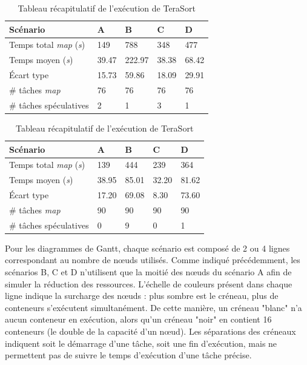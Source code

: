 \begin{table}
	\caption{Tableau récapitulatif de l'exécution de TeraSort} \label{tab:resumo}
	\centering
	\begin{tabular*}{0.6\hsize}{lllll} 
		\textbf{Scénario} & \textbf{A} & \textbf{B} & \textbf{C} & \textbf{D}\\
		\hline
		Temps total \textit{map} ({\it{s}}) & 149 & 788 & 348 & 477 \\
		Temps moyen ({\it{s}}) & 39.47 & 222.97 & 38.38 & 68.42 \\
		Écart type & 15.73 & 59.86 & 18.09 & 29.91 \\
		\# tâches \textit{map} & 76 & 76 & 76 & 76 \\
		\# tâches spéculatives & 2 & 1 & 3 & 1 \\
	\end{tabular*}
\end{table}

\begin{table}
	\caption{Tableau récapitulatif de l'exécution de TeraSort} \label{tab:DFSIO}
	\centering
	\begin{tabular*}{0.6\hsize}{lllll} 
		\textbf{Scénario} & \textbf{A} & \textbf{B} & \textbf{C} & \textbf{D}\\
		\hline
		Temps total \textit{map} ({\it{s}}) & 139 & 444 & 239 & 364 \\
		Temps moyen ({\it{s}}) & 38.95 & 85.01 & 32.20 & 81.62 \\
		Écart type  & 17.20 & 69.08 & 8.30 & 73.60 \\
		\# tâches \textit{map} & 90 & 90 & 90 & 90 \\
		\# tâches spéculatives & 0 & 9 & 0 & 1 \\
	\end{tabular*}
\end{table}


Pour les diagrammes de Gantt, chaque scénario est composé de 2 ou 4 lignes correspondant au nombre de n{\oe}uds utilisés. Comme indiqué précédemment, les scénarios B, C et D n'utilisent que la moitié des n{\oe}uds du scénario A afin de simuler la réduction des ressources. L'échelle de couleurs présent dans chaque ligne indique la surcharge des n{\oe}uds : plus sombre est le créneau, plus de conteneurs s'exécutent simultanément. De cette manière, un créneau "blanc" n'a aucun conteneur en exécution, alors qu'un créneau "noir" en contient 16 conteneurs (le double de la capacité d'un n{\oe}ud). Les séparations des créneaux indiquent soit le démarrage d'une tâche, soit une fin d'exécution, mais ne permettent pas de suivre le temps d'exécution d'une tâche précise. 

